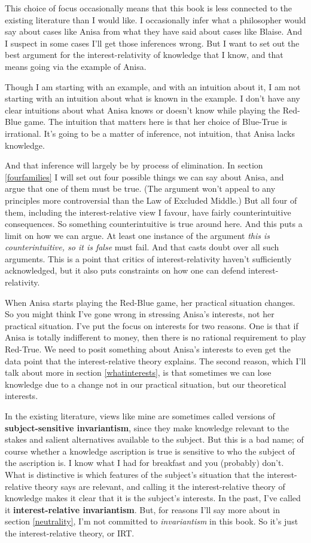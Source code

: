 \documentclass[11pt,]{book}
\begin{document}
This choice of focus occasionally means that this book is less connected to the existing literature than I would like. I occasionally infer what a philosopher would say about cases like Anisa from what they have said about cases like Blaise. And I suspect in some cases I'll get those inferences wrong. But I want to set out the best argument for the interest-relativity of knowledge that I know, and that means going via the example of Anisa.

Though I am starting with an example, and with an intuition about it, I am not starting with an intuition about what is known in the example. I don't have any clear intuitions about what Anisa knows or doesn't know while playing the Red-Blue game. The intuition that matters here is that her choice of Blue-True is irrational. It's going to be a matter of inference, not intuition, that Anisa lacks knowledge.

And that inference will largely be by process of elimination. In section \ref{fourfamilies} I will set out four possible things we can say about Anisa, and argue that one of them must be true. (The argument won't appeal to any principles more controversial than the Law of Excluded Middle.) But all four of them, including the interest-relative view I favour, have fairly counterintuitive consequences. So something counterintuitive is true around here. And this puts a limit on how we can argue. At least one instance of the argument \emph{this is counterintuitive, so it is false} must fail. And that casts doubt over all such arguments. This is a point that critics of interest-relativity haven't sufficiently acknowledged, but it also puts constraints on how one can defend interest-relativity.

When Anisa starts playing the Red-Blue game, her practical situation changes. So you might think I've gone wrong in stressing Anisa's interests, not her practical situation. I've put the focus on interests for two reasons. One is that if Anisa is totally indifferent to money, then there is no rational requirement to play Red-True. We need to posit something about Anisa's interests to even get the data point that the interest-relative theory explains. The second reason, which I'll talk about more in section \ref{whatinterests}, is that sometimes we can lose knowledge due to a change not in our practical situation, but our theoretical interests.

In the existing literature, views like mine are sometimes called versions of \textbf{subject-sensitive invariantism}, since they make knowledge relevant to the stakes and salient alternatives available to the subject. But this is a bad name; of course whether a knowledge ascription is true is sensitive to who the subject of the ascription is. I know what I had for breakfast and you (probably) don't. What is distinctive is which features of the subject's situation that the interest-relative theory says are relevant, and calling it the interest-relative theory of knowledge makes it clear that it is the subject's interests. In the past, I've called it \textbf{interest-relative invariantism}. But, for reasons I'll say more about in section \ref{neutrality}, I'm not committed to \emph{invariantism} in this book. So it's just the interest-relative theory, or IRT.
\end{document}

